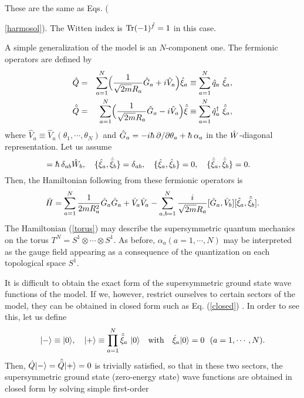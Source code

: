 \documentclass[a4paper,12pt]{article}
\begin{document}
These are the same as Eqs. ({\ref{harmosol}).
The Witten index is ${\rm Tr}(-1)^{{\hat f}}=1$ in this case. 
\par
A simple generalization of the model is an $N$-component one. 
The fermionic operators are defined by
\begin{eqnarray}
\hat Q &=&\sum_{a=1}^{N}
\Bigl({1\over{\sqrt{2m}R_a}}\hat G_a +i {\hat V}_a\Bigr)\hat\xi_a \equiv 
\sum_{a=1}^{N}{\hat q}_a~\hat\xi_a,
\label{nsupercharge}\\
\hat{\bar Q}&=&\sum_{a=1}^{N}
\Bigl({1\over{\sqrt{2m}R_a}}\hat G_a-i{\hat V}_a\Bigr)\hat{\bar\xi} \equiv 
\sum_{a=1}^{N}{\hat q}_a^{\dagger}~\hat{\bar\xi}_a,
\label{nsupercharge1}
\end{eqnarray}
where ${\hat V}_a\equiv {\hat V}_a(\theta_1, \cdots, \theta_N)$ and 
$\hg_a=-i\hbar~\del/\del\theta_a+\hbar~\alpha_a$ in 
the $\hat W$-diagonal representation. Let us assume 
\begin{equation}
[\hg_a, \hw_b]=\hbar~\delta_{ab}\hw_b, \quad
\{\hxi_a, \hxib_b\}=\delta_{ab}, \quad
\{\hxi_a, \hxi_b\}=0, \quad
\{\hxib_a, \hxib_b\}=0. \quad
\end{equation}
Then, the Hamiltonian following from these fermionic operators is
\begin{equation}
{\hat H}=\sum_{a=1}^N{1\over {2 m R_a^2}}\hat G_a\hat G_a + {\hat V}_a{\hat V}_a
-\sum_{a, b=1}^N{i\over {{\sqrt{2m}R_a}}}
[\hat G_a, {\hat V}_b][\hat\xi_a, \hat{\bar\xi}_b].
\label{torus}
\end{equation}
The Hamiltonian (\ref{torus}) may describe the supersymmetric quantum 
mechanics on the torus $T^N=S^1\otimes\cdots\otimes S^1$. 
As before, $\alpha_a (a=1, \cdots, N)$ may be interpreted as the gauge field 
appearing as a consequence of the quantization on each topological 
space $S^1$. 
\par
It is difficult to obtain the exact form of the supersymmetric 
ground state wave functions of the model. If we, however, restrict 
ourselves to
certain sectors of the model, they can be obtained in closed 
form such as Eq. (\ref{closed}) \cite{claud}. 
In order to see this, let us define 
\begin{equation}
|{-}\rangle\equiv |{0}\rangle,\quad |{+}\rangle\equiv \prod_{a=1}^N\hat{\bar\xi}_a~|{0}\rangle\quad
{\rm with}\quad \hat\xi_a |{0}\rangle=0~~(a=1, \cdots, N).
\end{equation}
Then, $\hat Q|{-}\rangle=\hat{\bar Q}|{+}\rangle=0$ is trivially satisfied, so that in these 
two sectors, the supersymmetric ground state (zero-energy state) wave 
functions are obtained in closed form by solving simple first-order
}
\end{document}
